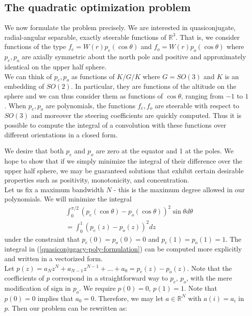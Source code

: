 \documentclass{article}
\theoremstyle{definition}
\theoremstyle{remark}
\numberwithin{equation}{section}
\begin{document}
\subsection{The quadratic optimization problem}
\label{problem}

We now formulate the problem precisely. We are interested in quasiconjugate, radial-angular separable, exactly steerable functions of $\mathbb{R}^3$. That is, we consider functions of the type $f_e = W(r)p_e(\cos \theta)$ and $f_o = W(r)p_o(\cos \theta)$ where $p_e, p_o$ are axially symmetric about the north pole and positive and approximately identical on the upper half sphere. \\

We can think of $p_e, p_o$ as functions of $K/G/K$ where $G=SO(3)$ and $K$ is an embedding of $SO(2)$. In particular, they are functions of the altitude on the sphere and we can thus consider them as functions of $\cos \theta$, ranging from $-1$ to $1$. When $p_e, p_o$ are polynomials, the functions $f_e, f_o$ are steerable with respect to $SO(3)$ and moreover the steering coefficients are quickly computed. Thus it is possible to compute the integral of a convolution with these functions over different orientations in a closed form.

We desire that both $p_e$ and $p_o$ are zero at the equator and 1 at the poles. We hope to show that if we simply minimize the integral of their difference over the upper half sphere, we may be guaranteed solutions that exhibit certain desirable properties such as positivity, monotonicity, and concentration. \\

Let us fix a maximum bandwidth $N$ - this is the maximum degree allowed in our polynomials. We will minimize the integral
\begin{align}
&\int_0^{\pi/2} (p_e(\cos\theta) - p_o(\cos\theta))^2 \sin\theta d\theta\\ \label{quasiconjugacy-poly-formulation}
&= \int_0^1 (p_e(z) - p_o(z))^2 dz
\end{align}
under the constraint that $p_e(0)=p_o(0) = 0$ and $p_e(1) = p_o(1) = 1$. The integral in (\ref{quasiconjugacy-poly-formulation}) can be computed more explicitly and written in a vectorized form. \\
Let $p(z) = a_Nz^N + a_{N-1}z^{N-1} + ... + a_0 = p_e(z) - p_o(z)$. Note that the coefficients of $p$ correspond in a straightforward way to $p_e$, $p_o$, with the mere modification of sign in $p_o$. We require $p(0) = 0$, $p(1) = 1$. Note that $p(0)=0$ implies that $a_0 = 0$. Therefore, we may let  $a\in \mathbb{R}^N$ with $a(i) = a_i$ in $p$. Then our problem can be rewritten as: 
\end{document}
